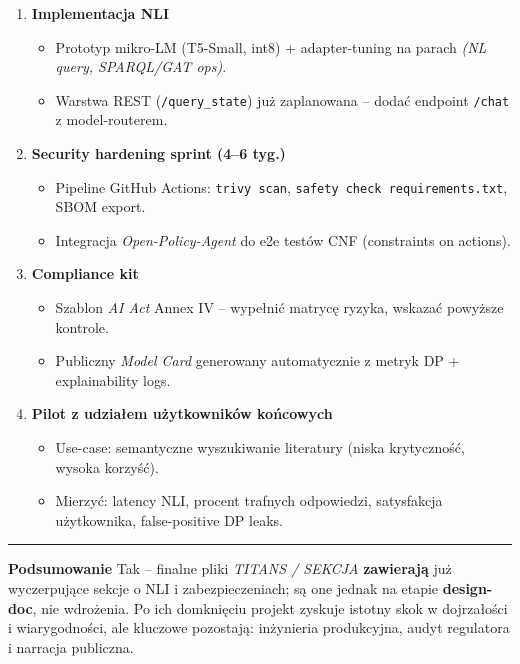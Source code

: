 \documentclass[letterpaper,twocolumn]{article}
\providecommand{\tightlist}{%
  \setlength{\itemsep}{0pt}\setlength{\parskip}{0pt}}
\begin{document}
\begin{enumerate}
\def\labelenumi{\arabic{enumi}.}
\item
  \textbf{Implementacja NLI}

  \begin{itemize}
  \tightlist
  \item
    Prototyp mikro-LM (T5-Small, int8) + adapter-tuning na parach
    \emph{(NL query, SPARQL/GAT ops)}.
  \item
    Warstwa REST (\texttt{/query\_state}) już zaplanowana -- dodać
    endpoint \texttt{/chat} z model-routerem.
  \end{itemize}
\item
  \textbf{Security hardening sprint (4--6 tyg.)}

  \begin{itemize}
  \tightlist
  \item
    Pipeline GitHub Actions: \texttt{trivy\ scan},
    \texttt{safety\ check\ requirements.txt}, SBOM export.
  \item
    Integracja \emph{Open-Policy-Agent} do e2e testów CNF (constraints
    on actions).
  \end{itemize}
\item
  \textbf{Compliance kit}

  \begin{itemize}
  \tightlist
  \item
    Szablon \emph{AI Act} Annex IV -- wypełnić matrycę ryzyka, wskazać
    powyższe kontrole.
  \item
    Publiczny \emph{Model Card} generowany automatycznie z metryk DP +
    explainability logs.
  \end{itemize}
\item
  \textbf{Pilot z udziałem użytkowników końcowych}

  \begin{itemize}
  \tightlist
  \item
    Use-case: semantyczne wyszukiwanie literatury (niska krytyczność,
    wysoka korzyść).
  \item
    Mierzyć: latency NLI, procent trafnych odpowiedzi, satysfakcja
    użytkownika, false-positive DP leaks.
  \end{itemize}
\end{enumerate}

\begin{center}\rule{0.5\linewidth}{0.5pt}\end{center}

\textbf{Podsumowanie} Tak -- finalne pliki \emph{TITANS / SEKCJA}
\textbf{zawierają} już wyczerpujące sekcje o NLI i zabezpieczeniach; są
one jednak na etapie \textbf{design-doc}, nie wdrożenia. Po ich
domknięciu projekt zyskuje istotny skok w dojrzałości i wiarygodności,
ale kluczowe pozostają: inżynieria produkcyjna, audyt regulatora i
narracja publiczna.
\end{document}
